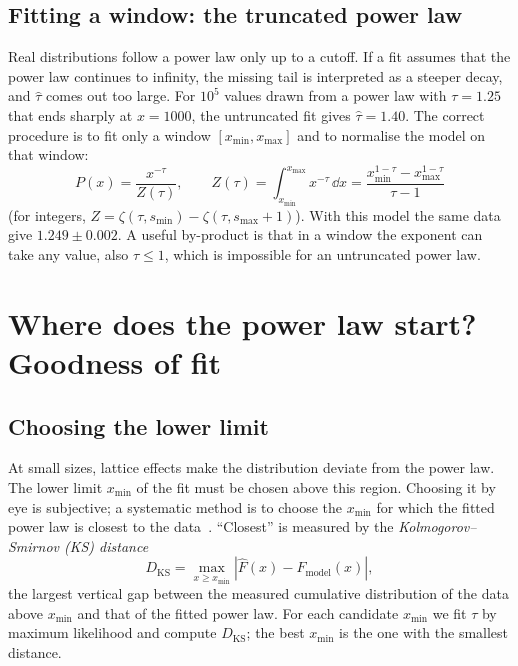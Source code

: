 \subsection{Fitting a window: the truncated power law}

Real distributions follow a power law only up to a cutoff. If a fit assumes that the power law continues to infinity, the
missing tail is interpreted as a steeper decay, and $\hat\tau$ comes out too large. For $10^5$ values drawn from a power law
with $\tau=1.25$ that ends sharply at $x=1000$, the untruncated fit gives $\hat\tau = 1.40$. The correct procedure is to fit
only a window $[x_{\min}, x_{\max}]$ and to normalise the model on that window:
\begin{equation}
  P(x) = \frac{x^{-\tau}}{Z(\tau)}, \qquad Z(\tau) = \int_{x_{\min}}^{x_{\max}} x^{-\tau}\,\dd x =
  \frac{x_{\min}^{1-\tau} - x_{\max}^{1-\tau}}{\tau-1}
\end{equation}
(for integers, $Z = \zeta(\tau, s_{\min}) - \zeta(\tau, s_{\max}+1)$). With this model the same data give $1.249\pm0.002$.
A useful by-product is that in a window the exponent can take any value, also $\tau\le1$, which is impossible for an
untruncated power law.

\section{Where does the power law start? Goodness of fit}
\label{sec:xmin}

\subsection{Choosing the lower limit}

At small sizes, lattice effects make the distribution deviate from the power law. The lower limit $x_{\min}$ of the fit must
be chosen above this region. Choosing it by eye is subjective; a systematic method is to choose the $x_{\min}$ for which the
fitted power law is closest to the data~\cite{Clauset2009}. ``Closest'' is measured by the \emph{Kolmogorov--Smirnov (KS)
distance}
\begin{equation}
  D_{\mathrm{KS}} = \max_{x\ge x_{\min}}\left|\hat F(x) - F_{\text{model}}(x)\right| ,
\end{equation}
the largest vertical gap between the measured cumulative distribution of the data above $x_{\min}$ and that of the fitted
power law. For each candidate $x_{\min}$ we fit $\tau$ by maximum likelihood and compute $D_{\mathrm{KS}}$; the best $x_{\min}$ is
the one with the smallest distance.

